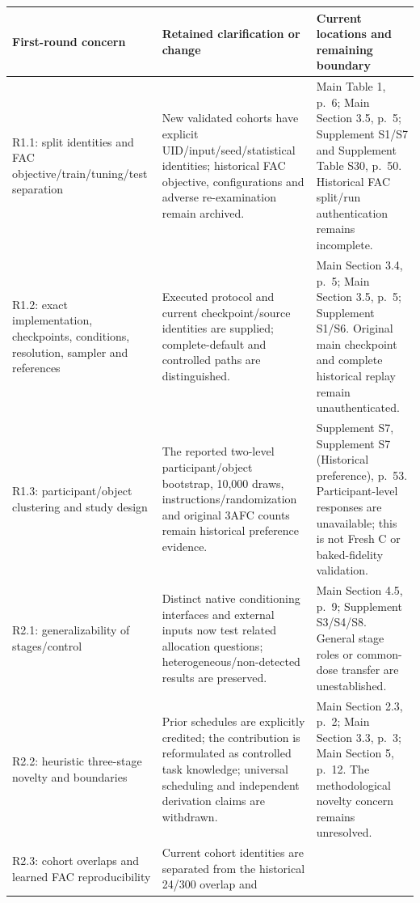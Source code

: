 \documentclass[
  10pt,
]{article}
\begin{document}
\begin{longtable}[]{@{}
  >{\raggedright\arraybackslash}p{}
  >{\raggedright\arraybackslash}p{}
  >{\raggedright\arraybackslash}p{}@{}}
\toprule
First-round concern & Retained clarification or change & Current
locations and remaining boundary \\
\midrule
\endhead
R1.1: split identities and FAC objective/train/tuning/test separation &
New validated cohorts have explicit UID/input/seed/statistical
identities; historical FAC objective, configurations and adverse
re-examination remain archived. & Main Table 1, p.~6; Main Section 3.5,
p.~5; Supplement S1/S7 and Supplement Table S30, p.~50. Historical FAC
split/run authentication remains incomplete. \\
R1.2: exact implementation, checkpoints, conditions, resolution, sampler
and references & Executed protocol and current checkpoint/source
identities are supplied; complete-default and controlled paths are
distinguished. & Main Section 3.4, p.~5; Main Section 3.5, p.~5;
Supplement S1/S6. Original main checkpoint and complete historical
replay remain unauthenticated. \\
R1.3: participant/object clustering and study design & The reported
two-level participant/object bootstrap, 10,000 draws,
instructions/randomization and original 3AFC counts remain historical
preference evidence. & Supplement S7, Supplement S7 (Historical
preference), p.~53. Participant-level responses are unavailable; this is
not Fresh C or baked-fidelity validation. \\
R2.1: generalizability of stages/control & Distinct native conditioning
interfaces and external inputs now test related allocation questions;
heterogeneous/non-detected results are preserved. & Main Section 4.5,
p.~9; Supplement S3/S4/S8. General stage roles or common-dose transfer
are unestablished. \\
R2.2: heuristic three-stage novelty and boundaries & Prior schedules are
explicitly credited; the contribution is reformulated as controlled task
knowledge; universal scheduling and independent derivation claims are
withdrawn. & Main Section 2.3, p.~2; Main Section 3.3, p.~3; Main
Section 5, p.~12. The methodological novelty concern remains
unresolved. \\
R2.3: cohort overlaps and learned FAC reproducibility & Current cohort
identities are separated from the historical 24/300 overlap and

\end{longtable}
\end{document}
